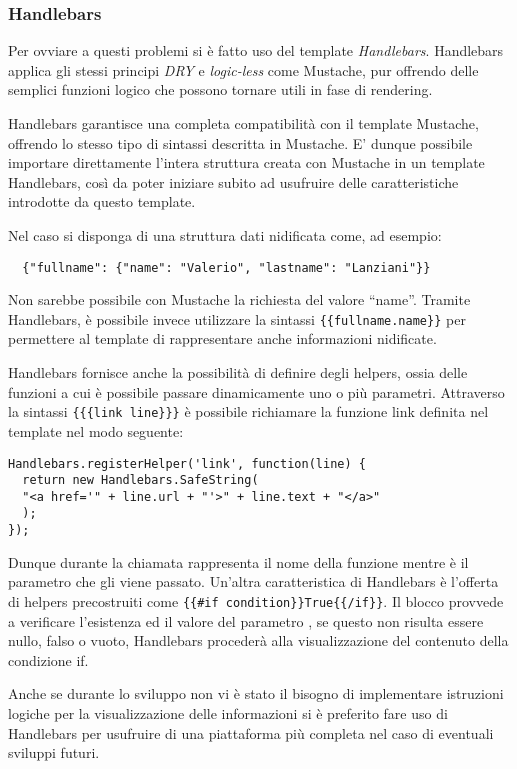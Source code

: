 \subsubsection{Handlebars} %
\label{ssub:handlebars}
Per ovviare a questi problemi si è fatto uso del template {\itshape Handlebars}.
Handlebars applica gli stessi principi {\itshape DRY} e {\itshape logic-less} come Mustache, pur offrendo delle semplici funzioni logico che possono tornare utili in fase di rendering.

Handlebars garantisce una completa compatibilità con il template Mustache, offrendo lo stesso tipo di sintassi descritta in Mustache. E' dunque possibile importare direttamente l'intera struttura creata con Mustache in un template Handlebars, così da poter iniziare subito ad usufruire delle caratteristiche introdotte da questo template.

Nel caso si disponga di una struttura dati nidificata come, ad esempio:
{\small
\begin{verbatim}
  {"fullname": {"name": "Valerio", "lastname": "Lanziani"}}
\end{verbatim}
}
Non sarebbe possibile con Mustache la richiesta del valore ``name''. Tramite Handlebars, è possibile invece utilizzare la sintassi \lstinline!{{fullname.name}}! per permettere al template di rappresentare anche informazioni nidificate.

Handlebars fornisce anche la possibilità di definire degli helpers, ossia delle funzioni a cui è possibile passare dinamicamente uno o più parametri. Attraverso la sintassi \lstinline!{{{link line}}}! è possibile richiamare la funzione link definita nel template nel modo seguente:
{\small
\begin{verbatim}
Handlebars.registerHelper('link', function(line) {
  return new Handlebars.SafeString(
  "<a href='" + line.url + "'>" + line.text + "</a>"
  );
});
\end{verbatim}
}
Dunque durante la chiamata  rappresenta il nome della funzione mentre  è il parametro che gli viene passato.
Un'altra caratteristica di Handlebars è l'offerta di helpers precostruiti come \lstinline!{{#if condition}}True{{/if}}!. Il blocco provvede a verificare l'esistenza ed il valore del parametro , se questo non risulta essere nullo, falso o vuoto, Handlebars procederà alla visualizzazione del contenuto della condizione if.

Anche se durante lo sviluppo non vi è stato il bisogno di implementare istruzioni logiche per la visualizzazione delle informazioni si è preferito fare uso di Handlebars per usufruire di una piattaforma più completa nel caso di eventuali sviluppi futuri.

